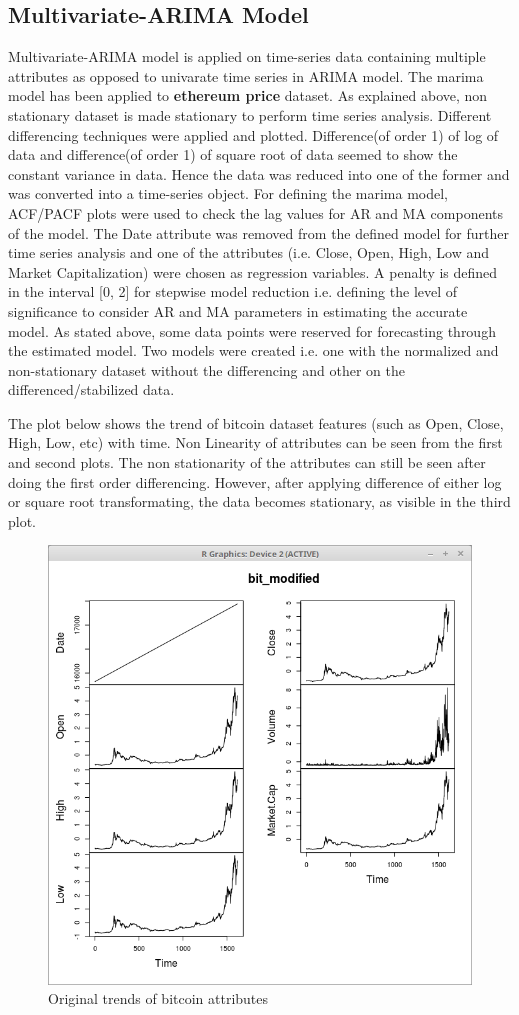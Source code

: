 \documentclass{article}
\begin{document}
\subsection{Multivariate-ARIMA Model}
Multivariate-ARIMA model is applied on time-series data containing multiple attributes as opposed to univarate time series in ARIMA model. The marima model has been applied to \textbf{ethereum price} dataset. As explained above, non stationary dataset is made stationary to perform time series analysis. Different differencing techniques were applied and plotted. Difference(of order 1) of log of data and difference(of order 1) of square root of data seemed to show the constant variance in data. Hence the data was reduced into one of the former and was converted into a time-series object. For defining the marima model, ACF/PACF plots were used to check the lag values for AR and MA components of the model. The Date attribute was removed from the defined model for further time series analysis and one of the attributes (i.e. Close, Open, High, Low and Market Capitalization) were chosen as regression variables. A penalty is defined in the interval [0, 2] for stepwise model reduction i.e. defining the level of significance to consider AR and MA parameters in estimating the accurate model. As stated above, some data points were reserved for forecasting through the estimated model. Two models were created i.e. one with the normalized and non-stationary dataset without the differencing and other on the differenced/stabilized data. 

The plot below shows the trend of bitcoin dataset features (such as Open, Close, High, Low, etc) with time. Non Linearity of attributes can be seen from the first and second plots. The non stationarity of the attributes can still be seen after doing the first order differencing. However, after applying difference of either log or square root transformating, the data becomes stationary, as visible in the third plot.
\begin{figure}[ht]
	\centering
	\includegraphics[width = 6 cm]{btc_attributes.png}
	\caption{Original trends of bitcoin attributes}
	\label{fig: btc_attri}
\end{figure}
\end{document}
